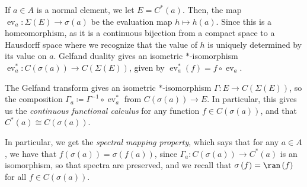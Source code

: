 \documentclass[10pt]{mypackage}
\renewcommand{\coloneq}{\coloneqq}
\begin{document}
If $a\in A$ is a normal element, we let $E = C^{\ast}\left( a \right)$. Then, the map $\operatorname{ev}_a\colon \Sigma(E)\to \sigma(a)$ be the evaluation map $h\mapsto h(a)$. Since this is a homeomorphism, as it is a continuous bijection from a compact space to a Hausdorff space where we recognize that the value of $h$ is uniquely determined by its value on $a$. Gelfand duality gives an isometric $\ast$-isomorphism $\operatorname{ev}_a^{\ast}\colon C\left( \sigma(a) \right)\to C\left( \Sigma(E) \right)$, given by $\operatorname{ev}_a^{\ast}\left( f \right) = f\circ \operatorname{ev}_a$.

The Gelfand transform gives an isometric $\ast$-isomorphism $\Gamma\colon E\to C\left( \Sigma(E) \right)$, so the composition $\Gamma_a\coloneq \Gamma^{-1}\circ \operatorname{ev}_a^{\ast}$ from $C\left( \sigma(a) \right)\to E$. In particular, this gives us the \textit{continuous functional calculus} for any function $f\in C\left( \sigma(a) \right)$, and that $C^{\ast}\left( a \right)\cong C\left( \sigma(a) \right)$.

In particular, we get the \textit{spectral mapping property}, which says that for any $a\in A$, we have that $f\left( \sigma(a) \right) = \sigma\left( f(a) \right)$, since $\Gamma_a\colon C\left( \sigma(a) \right)\to C^{\ast}\left( a \right)$ is an isomorphism, so that spectra are preserved, and we recall that $\sigma\left( f \right) = \ran\left( f \right)$ for all $f\in C\left( \sigma(a) \right)$.
\end{document}
